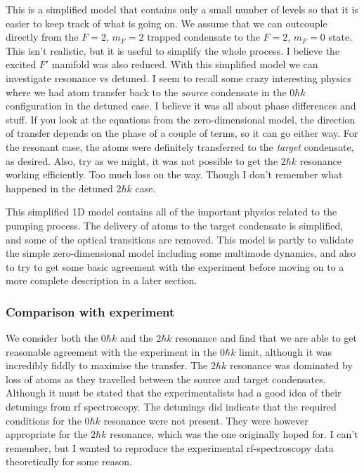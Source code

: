 This is a simplified model that contains only a small number of levels so that it is easier to keep track of what is going on.  We assume that we can outcouple directly from the $F=2$, $m_F=2$ trapped condensate to the $F=2$, $m_F=0$ state. This isn't realistic, but it is useful to simplify the whole process.  I believe the excited $F'$ manifold was also reduced.  With this simplified model we can investigate resonance vs detuned.  I seem to recall some crazy interesting physics where we had atom transfer back to the \emph{source} condensate in the $0 \hbar k$ configuration in the detuned case.  I believe it was all about phase differences and stuff.  If you look at the equations from the zero-dimensional model, the direction of transfer depends on the phase of a couple of terms, so it can go either way.  For the resonant case, the atoms were definitely transferred to the \emph{target} condensate, as desired.  Also, try as we might, it was not possible to get the $2 \hbar k$ resonance working efficiently.  Too much loss on the way.  Though I don't remember what happened in the detuned $2 \hbar k$ case.

This simplified 1D model contains all of the important physics related to the pumping process.  The delivery of atoms to the target condensate is simplified, and some of the optical transitions are removed.  This model is partly to validate the simple zero-dimensional model including some multimode dynamics, and also to try to get some basic agreement with the experiment before moving on to a more complete description in a later section.

\subsubsection{Comparison with experiment}

We consider both the $0\hbar k$ and the $2\hbar k$ resonance and find that we are able to get reasonable agreement with the experiment in the $0\hbar k$ limit, although it was incredibly fiddly to maximise the transfer.  The $2\hbar k$ resonance was dominated by loss of atoms as they travelled between the source and target condensates.  Although it must be stated that the experimentalists had a good idea of their detunings from rf spectroscopy.  The detunings did indicate that the required conditions for the $0 \hbar k$ resonance were not present.  They were however appropriate for the $2 \hbar k$ resonance, which was the one originally hoped for.  I can't remember, but I wanted to reproduce the experimental rf-spectroscopy data theoretically for some reason.

